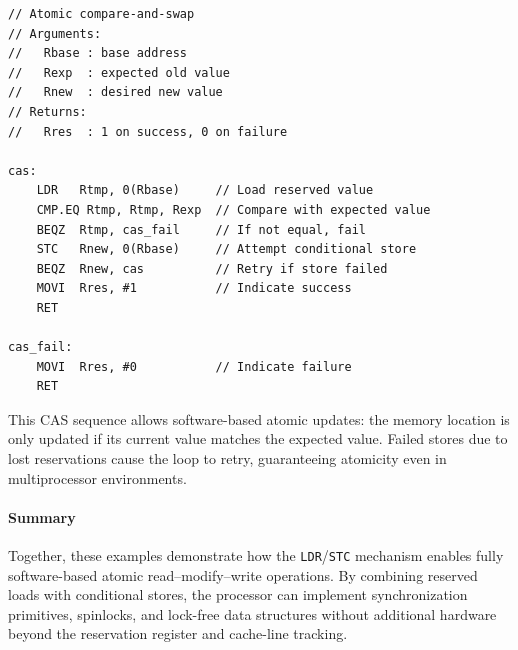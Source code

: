 \smallskip
\begin{lstlisting}
// Atomic compare-and-swap
// Arguments:
//   Rbase : base address
//   Rexp  : expected old value
//   Rnew  : desired new value
// Returns:
//   Rres  : 1 on success, 0 on failure

cas:
    LDR   Rtmp, 0(Rbase)     // Load reserved value
    CMP.EQ Rtmp, Rtmp, Rexp  // Compare with expected value
    BEQZ  Rtmp, cas_fail     // If not equal, fail
    STC   Rnew, 0(Rbase)     // Attempt conditional store
    BEQZ  Rnew, cas          // Retry if store failed
    MOVI  Rres, #1           // Indicate success
    RET

cas_fail:
    MOVI  Rres, #0           // Indicate failure
    RET
\end{lstlisting}

This CAS sequence allows software-based atomic updates: the memory location is only updated if its current value matches the expected value.  
Failed stores due to lost reservations cause the loop to retry, guaranteeing atomicity even in multiprocessor environments.

\paragraph{Summary}

Together, these examples demonstrate how the \texttt{LDR}/\texttt{STC} mechanism enables fully software-based atomic read–modify–write operations.  
By combining reserved loads with conditional stores, the processor can implement synchronization primitives, spinlocks, and lock-free data structures without additional hardware beyond the reservation register and cache-line tracking.

